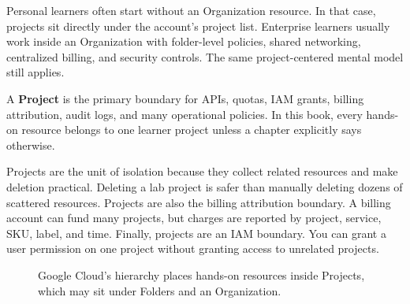 Personal learners often start without an Organization resource. In that case, projects sit directly under the account's project list. Enterprise learners usually work inside an Organization with folder-level policies, shared networking, centralized billing, and security controls. The same project-centered mental model still applies.

\begin{definitionbox}
A \textbf{Project} is the primary boundary for APIs, quotas, IAM grants, billing attribution, audit logs, and many operational policies. In this book, every hands-on resource belongs to one learner project unless a chapter explicitly says otherwise.
\end{definitionbox}

Projects are the unit of isolation because they collect related resources and make deletion practical. Deleting a lab project is safer than manually deleting dozens of scattered resources. Projects are also the billing attribution boundary. A billing account can fund many projects, but charges are reported by project, service, SKU, label, and time. Finally, projects are an IAM boundary. You can grant a user permission on one project without granting access to unrelated projects.

\begin{figure}[H]
    \centering
    \caption{Google Cloud's hierarchy places hands-on resources inside Projects, which may sit under Folders and an Organization.}
    \label{fig:chapter0-resource-hierarchy}
\end{figure}

